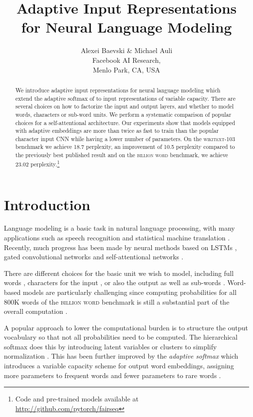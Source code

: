 \documentclass{article} \usepackage{iclr2019_conference,times}
\title{Adaptive Input Representations \\for Neural Language Modeling}
\author{Alexei Baevski \& Michael Auli  \\
Facebook AI Research, \\
Menlo Park, CA, USA\\
}
\def\gbw{\textsc{billion word}}
\def\wiki{\textsc{wikitext-103}}
\begin{document}
\maketitle

\begin{abstract}
We introduce adaptive input representations for neural language modeling which extend the adaptive softmax of \citet{grave2017icml} to input representations of variable capacity.
There are several choices on how to factorize the input and output layers, and whether to model words, characters or sub-word units. 
We perform a systematic comparison of popular choices for a self-attentional architecture.
Our experiments show that models equipped with adaptive embeddings are more than twice as fast to train than the popular character input CNN while having a lower number of parameters.
On the \wiki{} benchmark we achieve 18.7 perplexity, an improvement of 10.5 perplexity compared to the previously best published result and on the \gbw{} benchmark, we achieve 23.02 perplexity.\footnote{Code and pre-trained models available at \url{http://github.com/pytorch/fairseq}}
\end{abstract}

\section{Introduction}

Language modeling is a basic task in natural language processing, with many applications such as speech recognition \citep{arisoy:2012:wfnlm} and statistical machine translation \citep{schwenk:2012:wfnlm,vaswani:2013:emnlp,baltescu2014pragmatic}.
Recently, much progress has been made by neural methods \citep{bengio:2003:jmlr,mikolov:2010:interspeech} based on LSTMs \citep{jozefowicz2016lm}, gated convolutional networks \citep{dauphin2017convlm} and self-attentional networks \citep{alrfou2018chartrans}.

There are different choices for the basic unit we wish to model, including full words \citep{bengio:2003:jmlr}, characters for the input \citep{kim2016character}, or also the output \citep{merity2018lm} as well as sub-words \citep{buckman2018taacl,mielke2018spell}.
Word-based models are particularly challenging since computing probabilities for all 800K words of the \gbw{} benchmark is still a substantial part of the overall computation \citep{chen2016strategies}.

A popular approach to lower the computational burden is to structure the output vocabulary so that not all probabilities need to be computed.
The hierarchical softmax does this by introducing latent variables or clusters to simplify normalization \citep{goodman:2001:icassp,morin:2005:aistats,mikolov:2011:icassp}.
This has been further improved by the \emph{adaptive softmax} which introduces a variable capacity scheme for output word embeddings, assigning more parameters to frequent words and fewer parameters to rare words \citep{grave2017icml}.
\end{document}
